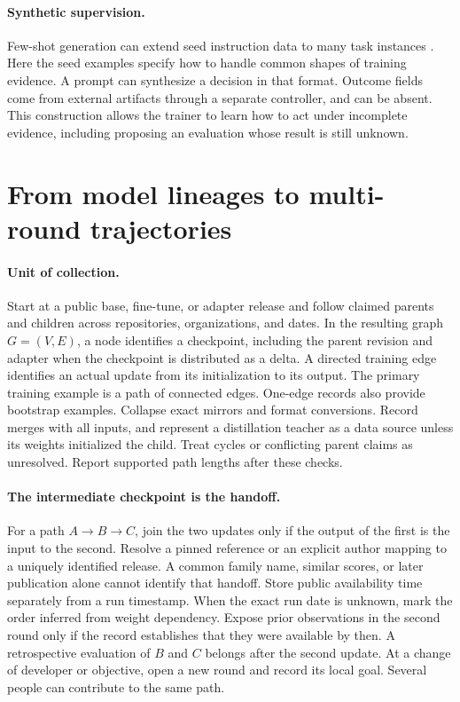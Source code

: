 \documentclass{article}
\begin{document}
\paragraph{Synthetic supervision.}
Few-shot generation can extend seed instruction data to many task instances \citep{wang2023selfinstruct}. Here the seed examples specify how to handle common shapes of training evidence. A prompt can synthesize a decision in that format. Outcome fields come from external artifacts through a separate controller, and can be absent. This construction allows the trainer to learn how to act under incomplete evidence, including proposing an evaluation whose result is still unknown.

\section{From model lineages to multi-round trajectories}
\label{sec:evidence}

\paragraph{Unit of collection.}
Start at a public base, fine-tune, or adapter release and follow claimed parents and children across repositories, organizations, and dates. In the resulting graph \(G=(V,E)\), a node identifies a checkpoint, including the parent revision and adapter when the checkpoint is distributed as a delta. A directed training edge identifies an actual update from its initialization to its output. The primary training example is a path of connected edges. One-edge records also provide bootstrap examples. Collapse exact mirrors and format conversions. Record merges with all inputs, and represent a distillation teacher as a data source unless its weights initialized the child. Treat cycles or conflicting parent claims as unresolved. Report supported path lengths after these checks.

\paragraph{The intermediate checkpoint is the handoff.}
For a path \(A\!\to\!B\!\to\!C\), join the two updates only if the output of the first is the input to the second. Resolve a pinned reference or an explicit author mapping to a uniquely identified release. A common family name, similar scores, or later publication alone cannot identify that handoff. Store public availability time separately from a run timestamp. When the exact run date is unknown, mark the order inferred from weight dependency. Expose prior observations in the second round only if the record establishes that they were available by then. A retrospective evaluation of \(B\) and \(C\) belongs after the second update. At a change of developer or objective, open a new round and record its local goal. Several people can contribute to the same path.
\end{document}
